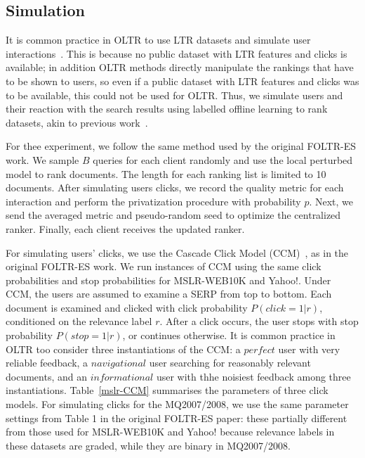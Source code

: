 \subsection{Simulation}
It is common practice in OLTR to use LTR datasets and simulate user interactions~\cite{DBLP:conf/wsdm/SchuthOWR16, DBLP:conf/wsdm/HofmannSWR13}. This is because no public dataset with LTR features and clicks is available; in addition OLTR methods directly manipulate the rankings that have to be shown to users, so even if a public dataset with LTR features and clicks was to be available, this could not be used for OLTR. Thus, we simulate users and their reaction with the search results using labelled offline learning to rank datasets, akin to previous work~\cite{DBLP:conf/wsdm/SchuthOWR16, DBLP:conf/wsdm/HofmannSWR13}.

For thee experiment, we follow the same method used by the original FOLTR-ES work. We sample $B$ queries for each client randomly and use the local perturbed model to rank documents. The length for each ranking list is limited to 10 documents. After simulating users clicks, we record the quality metric for each interaction and perform the privatization procedure with probability $p$. Next, we send the averaged metric and pseudo-random seed to optimize the centralized ranker. Finally, each client receives the updated ranker. 

For simulating users' clicks, we use the Cascade Click Model (CCM)~\cite{DBLP:conf/wsdm/GuoLW09}, as in the original FOLTR-ES work. We run instances of CCM using the same click probabilities and stop probabilities for MSLR-WEB10K and Yahoo!. Under CCM, the users are assumed to examine a SERP from top to bottom. Each document is examined and clicked with click probability $P(click = 1 | r)$, conditioned on the relevance label $r$. After a click occurs, the user stops with stop probability $P(stop = 1 | r)$, or continues otherwise. It is common practice in OLTR too consider three instantiations of the CCM: a $perfect$ user with very reliable feedback, a $navigational$ user searching for reasonably relevant documents, and an $informational$ user with thhe noisiest feedback among three instantiations.  Table~\ref{mslr-CCM} summarises the parameters of three click models. For simulating clicks for the MQ2007/2008, we use the same parameter settings from Table 1 in the original FOLTR-ES paper: these partially different from those used for MSLR-WEB10K and Yahoo! because relevance labels in these datasets are graded, while they are binary in MQ2007/2008.


